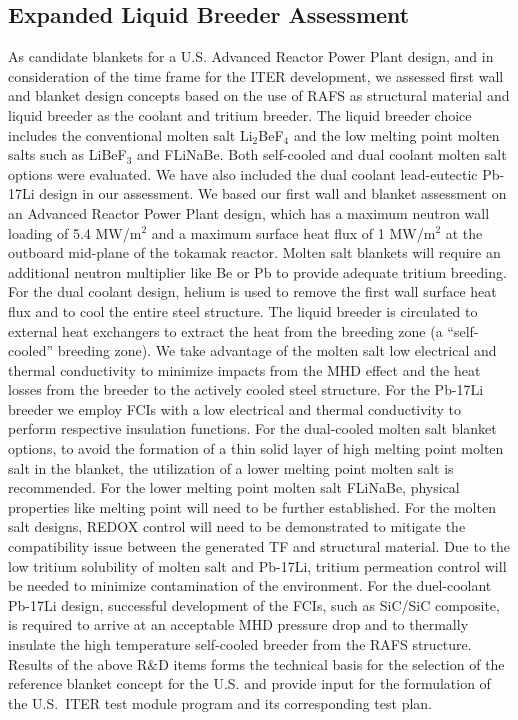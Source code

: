 \subsection{Expanded Liquid Breeder Assessment}

As candidate blankets for a U.S. Advanced Reactor Power Plant design, and in
consideration of the time frame for the ITER development, we assessed first
wall and blanket design concepts based on the use of \gls{RAFS} as structural
material and liquid breeder as the coolant and tritium breeder. The liquid
breeder choice includes the conventional molten salt Li$_2$BeF$_4$ and the low
melting point molten salts such as LiBeF$_3$ and FLiNaBe. Both self-cooled and
dual coolant molten salt options were evaluated. We have also included the
dual coolant lead-eutectic Pb-17Li design in our assessment. We based our
first wall and blanket assessment on an Advanced Reactor Power Plant design,
which has a maximum neutron wall loading of 5.4 MW/m$^2$ and a maximum surface
heat flux of 1 MW/m$^2$ at the outboard mid-plane of the tokamak
reactor. Molten salt blankets will require an additional neutron multiplier
like Be or Pb to provide adequate tritium breeding. For the dual coolant
design, helium is used to remove the first wall surface heat flux and to cool
the entire steel structure. The liquid breeder is circulated to external heat
exchangers to extract the heat from the breeding zone (a “self-cooled”
breeding zone). We take advantage of the molten salt low electrical and
thermal conductivity to minimize impacts from the \gls{MHD} effect and the
heat losses from the breeder to the actively cooled steel structure. For the
Pb-17Li breeder we employ \glspl{FCI} with a low electrical and thermal
conductivity to perform respective insulation functions. For the dual-cooled
molten salt blanket options, to avoid the formation of a thin solid layer of
high melting point molten salt in the blanket, the utilization of a lower
melting point molten salt is recommended.  For the lower melting point molten
salt FLiNaBe, physical properties like melting point will need to be further
established. For the molten salt designs, REDOX control will need to be
demonstrated to mitigate the compatibility issue between the generated TF and
structural material. Due to the low tritium solubility of molten salt and
Pb-17Li, tritium permeation control will be needed to minimize contamination
of the environment. For the duel-coolant Pb-17Li design, successful
development of the \glspl{FCI}, such as SiC/SiC composite, is required to
arrive at an acceptable \gls{MHD} pressure drop and to thermally insulate the
high temperature self-cooled breeder from the \gls{RAFS} structure. Results of
the above R\&D items forms the technical basis for the selection of the
reference blanket concept for the U.S. and provide input for the formulation
of the U.S.\ ITER test module program and its corresponding test
plan.


